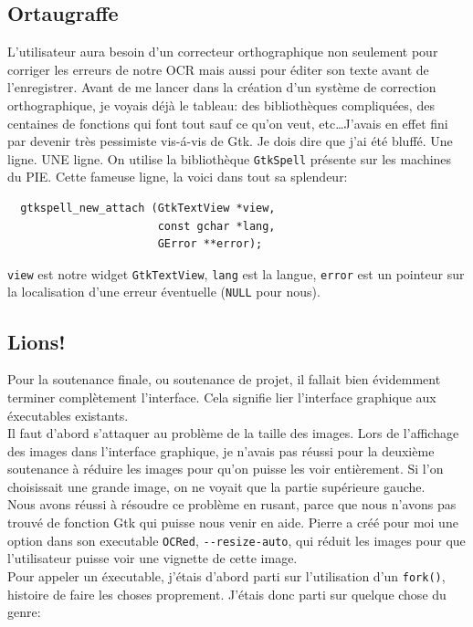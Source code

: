 \documentclass[a4paper,12pt]{report}
\begin{document}
\subsection{Ortaugraffe} %
\label{sec:ortaugraffe}
	L'utilisateur aura besoin d'un correcteur orthographique non seulement pour corriger les erreurs de notre OCR mais aussi pour \'editer son texte avant de l'enregistrer. Avant de me lancer dans la cr\'eation d'un syst\`eme de correction orthographique, je voyais d\'ej\`a le tableau: des biblioth\`eques compliqu\'ees, des centaines de fonctions qui font tout sauf ce qu'on veut, etc\ldots J'avais en effet fini par devenir tr\`es pessimiste vis-\'a-vis de Gtk. Je dois dire que j'ai \'et\'e bluff\'e. Une ligne. UNE ligne. On utilise la biblioth\`eque \verb!GtkSpell! pr\'esente sur les machines du PIE. Cette fameuse ligne, la voici dans tout sa splendeur:
	\begin{lstlisting}
  gtkspell_new_attach (GtkTextView *view,
                       const gchar *lang,
                       GError **error);
	\end{lstlisting}
	\verb!view! est notre widget \verb!GtkTextView!, \verb!lang! est la langue, \verb!error! est un pointeur sur la localisation d'une erreur \'eventuelle (\verb!NULL! pour nous).



\subsection{Lions!} %
\label{sub:lions_}
Pour la soutenance finale, ou soutenance de projet, il fallait bien \'evidemment terminer compl\`etement l'interface. Cela signifie lier l'interface graphique aux \'executables existants. \\
Il faut d'abord s'attaquer au probl\`eme de la taille des images. Lors de l'affichage des images dans l'interface graphique, je n'avais pas r\'eussi pour la deuxi\`eme soutenance \`a r\'eduire les images pour qu'on puisse les voir enti\`erement. Si l'on choisissait une grande image, on ne voyait que la partie sup\'erieure gauche.\\
Nous avons r\'eussi \`a r\'esoudre ce problème en rusant, parce que nous n'avons pas trouv\'e de fonction Gtk qui puisse nous venir en aide. Pierre a cr\'e\'e pour moi une option dans son executable \verb!OCRed!, \verb!--resize-auto!, qui r\'eduit les images pour que l'utilisateur puisse voir une vignette de cette image.\\
Pour appeler un \'executable, j'\'etais d'abord parti sur l'utilisation d'un \verb!fork()!, histoire de faire les choses proprement. J'\'etais donc parti sur quelque chose du genre:
\end{document}
